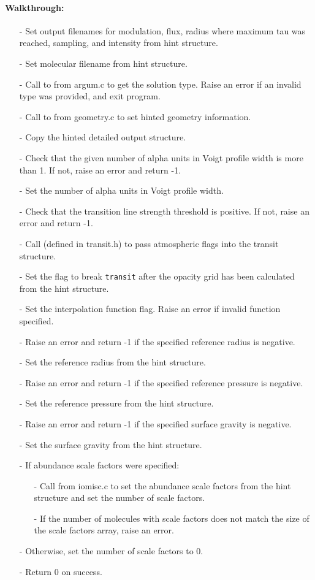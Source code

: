 \documentclass[letterpaper,12pt]{article}
\begin{document}
\paragraph{Walkthrough:}
\begin{enumerate}[leftmargin=10pt, noitemsep, parsep=0pt, topsep=0ex]
\item[-] Set output filenames for modulation, flux, radius where maximum tau was reached, sampling, and intensity from hint structure.
\item[-] Set molecular filename from hint structure.
\item[-] Call to  from argum.c to get the solution type. Raise an error if an invalid type was provided, and exit program.
\item[-] Call to  from geometry.c to set hinted geometry information.
\item[-] Copy the hinted detailed output structure.
\item[-] Check that the given number of alpha units in Voigt profile width is more than 1. If not, raise an error and return -1.
\item[-] Set the number of alpha units in Voigt profile width.
\item[-] Check that the transition line strength threshold is positive. If not, raise an error and return -1.
\item[-] Call  (defined in transit.h) to pass atmospheric flags into the transit structure.
\item[-] Set the flag to break {\tt transit} after the opacity grid has been calculated from the hint structure.
\item[-] Set the interpolation function flag. Raise an error if invalid function specified.
\item[-] Raise an error and return -1 if the specified reference radius is negative.
\item[-] Set the reference radius from the hint structure.
\item[-] Raise an error and return -1 if the specified reference pressure is negative.
\item[-] Set the reference pressure from the hint structure.
\item[-] Raise an error and return -1 if the specified surface gravity is negative.
\item[-] Set the surface gravity from the hint structure.
\item[-] If abundance scale factors were specified:
\begin{enumerate}[leftmargin=10pt, noitemsep, parsep=0pt, topsep=0ex]
\item[-] Call  from iomisc.c to set the abundance scale factors from the hint structure and set the number of scale factors.
\item[-] If the number of molecules with scale factors does not match the size of the scale factors array, raise an error.
\end{enumerate}
\item[-] Otherwise, set the number of scale factors to 0.
\item[-] Return 0 on success.
\end{enumerate}
\end{document}
